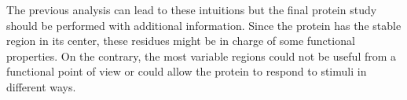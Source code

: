 The previous analysis can lead to these intuitions but the final protein study should be performed with additional information. Since the protein has the stable region in its center, these residues might be in charge of some functional properties. On the contrary, the most variable regions could not be useful from a functional point of view or could allow the protein to respond to stimuli in different ways.
